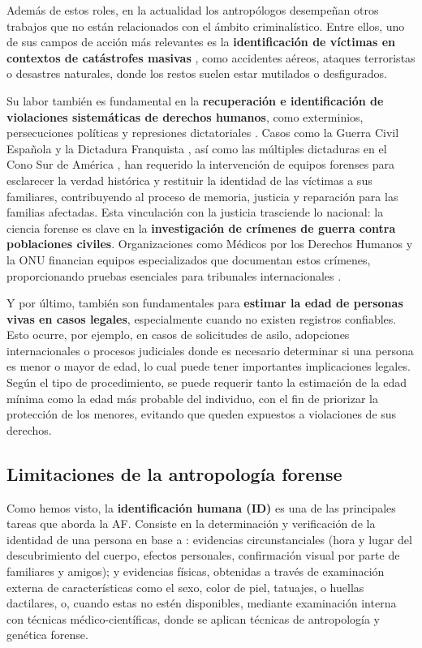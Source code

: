 Además de estos roles, en la actualidad los antropólogos desempeñan otros trabajos que no están relacionados 
con el ámbito criminalístico. Entre ellos, uno de sus campos de acción más relevantes es la 
\textbf{identificación de víctimas en contextos de catástrofes masivas} 
\cite{deBoer2019, prinz2007, beauthier2009}, como accidentes aéreos, ataques terroristas o desastres 
naturales, donde los restos suelen estar mutilados o desfigurados.

Su labor también es fundamental en la \textbf{recuperación e identificación de violaciones sistemáticas de
derechos humanos}, como exterminios, persecuciones políticas y represiones dictatoriales \cite{skinner2003}.
Casos como la Guerra Civil Española y la Dictadura Franquista \cite{sanchisgimeno2024, baeta2015}, así como 
las múltiples dictaduras en el Cono Sur de América \cite{ataliva2024}, han requerido la intervención de 
equipos forenses para esclarecer la verdad histórica y restituir la identidad de las víctimas a sus 
familiares, contribuyendo al proceso de memoria, justicia y reparación para las familias afectadas.
Esta vinculación con la justicia trasciende lo nacional: la ciencia forense es clave en la 
\textbf{investigación de crímenes de guerra contra poblaciones civiles}. Organizaciones como Médicos por los 
Derechos Humanos y la ONU financian equipos especializados que documentan estos crímenes, proporcionando 
pruebas esenciales para tribunales internacionales \cite{tanaka2020}.

Y por último, también son fundamentales para \textbf{estimar la edad de personas vivas en casos legales}, 
especialmente cuando no existen registros confiables. Esto ocurre, por ejemplo, en casos de solicitudes de 
asilo, adopciones internacionales o procesos judiciales donde es necesario determinar si una persona es menor 
o mayor de edad, lo cual puede tener importantes implicaciones legales. Según el tipo de procedimiento, se 
puede requerir tanto la estimación de la edad mínima como la edad más probable del individuo, con el fin de 
priorizar la protección de los menores, evitando que queden expuestos a violaciones de sus derechos.


\subsection{Limitaciones de la antropología forense}

Como hemos visto, la \textbf{identificación humana (ID)} es una de las principales tareas que aborda la AF.
Consiste en la determinación y verificación de la identidad de una persona en base a \cite{thompson2006}: 
evidencias circunstanciales (hora y lugar del descubrimiento del cuerpo, efectos personales, confirmación 
visual por parte de familiares y amigos); y evidencias físicas, obtenidas a través de examinación externa de 
características como el sexo, color de piel, tatuajes, o huellas dactilares, o, cuando estas no estén 
disponibles, mediante examinación interna con técnicas médico-científicas, donde se aplican técnicas de 
antropología y genética forense.

